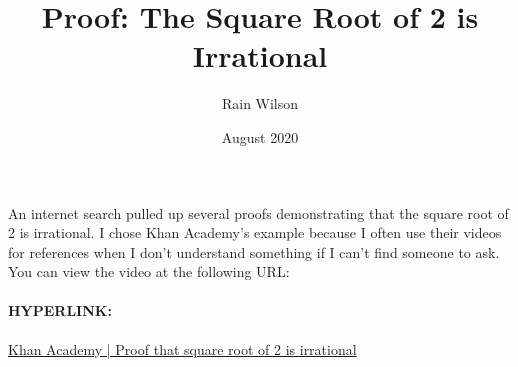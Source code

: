 \documentclass{article}
\title{Proof: The Square Root of 2 is Irrational}
\author{Rain Wilson}
\date{August 2020}
\begin{document}
\maketitle

An internet search pulled up several proofs demonstrating that the square root of 2 is irrational. I chose Khan Academy's example because I often use their videos for references when I don't understand something if I can't find someone to ask. You can view the video at the following URL:
\paragraph{HYPERLINK:}
\href{https://www.youtube.com/watch?v=mX91_3GQqLY}{Khan Academy | Proof that square root of 2 is irrational}
\end{document}
